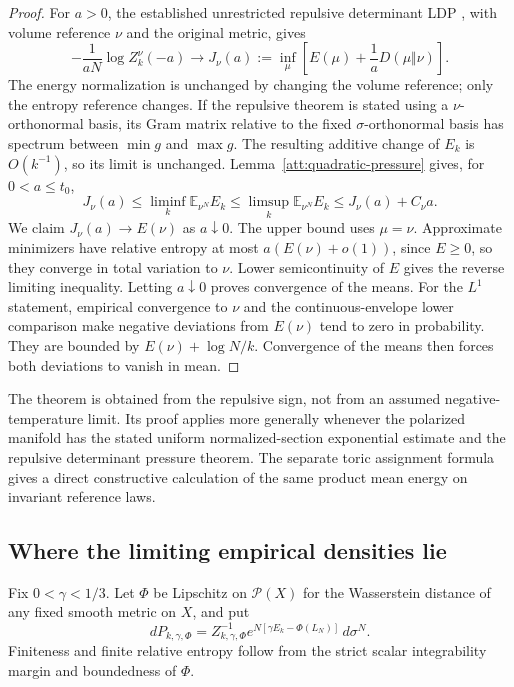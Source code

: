 \begin{proof}
For $a>0$, the established unrestricted repulsive determinant LDP
\cite[Theorems 1.1 and 5.7]{prob_berman2017}, with volume reference
$\nu$ and the original metric, gives
\[
 -\frac1{aN}\log Z_k^\nu(-a)\longrightarrow
 J_\nu(a):=\inf_\mu\left[E(\mu)+\frac1a D(\mu\Vert\nu)\right].
\]
The energy normalization is unchanged by changing the volume reference;
only the entropy reference changes. If the repulsive theorem is stated
using a $\nu$-orthonormal basis, its Gram matrix relative to the fixed
$\sigma$-orthonormal basis has spectrum between $\min g$ and $\max g$.
The resulting additive change of $E_k$ is $O(k^{-1})$, so its limit
is unchanged. Lemma~\ref{att:quadratic-pressure}
gives, for $0<a\le t_0$,
\[
 J_\nu(a)\le\liminf_k\mathbb E_{\nu^N}E_k
 \le\limsup_k\mathbb E_{\nu^N}E_k\le J_\nu(a)+C_\nu a.
\]
We claim $J_\nu(a)\to E(\nu)$ as $a\downarrow0$. The upper bound
uses $\mu=\nu$. Approximate minimizers have relative entropy at most
$a(E(\nu)+o(1))$, since $E\ge0$, so they converge in total variation
to $\nu$. Lower semicontinuity of $E$ gives the reverse limiting
inequality. Letting $a\downarrow0$ proves convergence of the means.
For the $L^1$ statement, empirical convergence to $\nu$ and the
continuous-envelope lower comparison make negative deviations from
$E(\nu)$ tend to zero in probability. They are bounded by
$E(\nu)+\log N/k$. Convergence of the means then forces both deviations
to vanish in mean.
\end{proof}

The theorem is obtained from the repulsive sign, not from an assumed
negative-temperature limit. Its proof applies more generally whenever
the polarized manifold has the stated uniform normalized-section
exponential estimate and the repulsive determinant pressure theorem.
The separate toric assignment formula gives a direct constructive
calculation of the same product mean energy on invariant reference laws.

\subsection{Where the limiting empirical densities lie}

Fix $0<\gamma<1/3$. Let $\Phi$ be Lipschitz on $\mathcal P(X)$ for
the Wasserstein distance of any fixed smooth metric on $X$, and put
\[
 dP_{k,\gamma,\Phi}=Z_{k,\gamma,\Phi}^{-1}
       e^{N[\gamma E_k-\Phi(L_N)]}\,d\sigma^N.
\]
Finiteness and finite relative entropy follow from the strict scalar
integrability margin and boundedness of $\Phi$.

